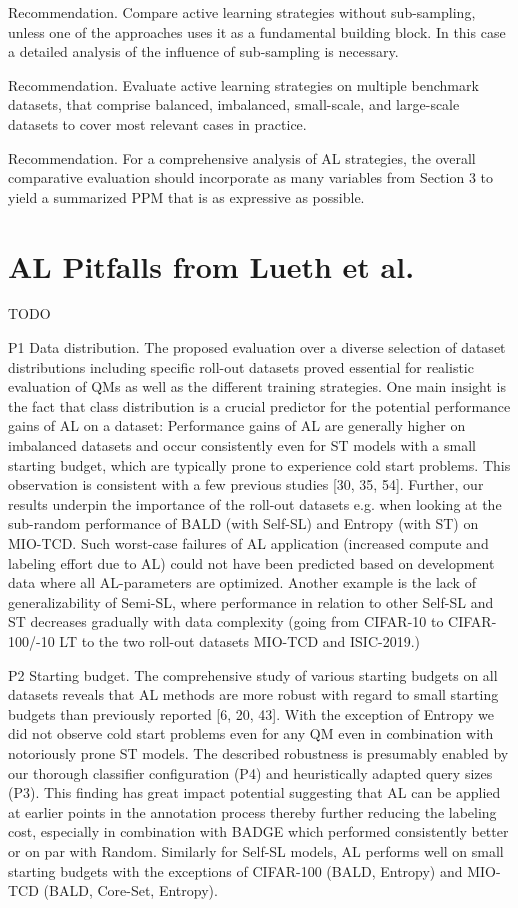 \documentclass[]{article}
\begin{document}
Recommendation. Compare active learning strategies
without sub-sampling, unless one of the approaches uses
it as a fundamental building block. In this case a detailed
analysis of the influence of sub-sampling is necessary.

Recommendation. Evaluate active learning strategies
on multiple benchmark datasets, that comprise balanced,
imbalanced, small-scale, and large-scale datasets to cover
most relevant cases in practice.

Recommendation. For a comprehensive analysis of
AL strategies, the overall comparative evaluation should
incorporate as many variables from Section 3 to yield a
summarized PPM that is as expressive as possible.


\section{AL Pitfalls from Lueth et al.}\label{app:pitfalls}
TODO

P1 Data distribution. The proposed evaluation over a diverse selection of dataset distributions
including specific roll-out datasets proved essential for realistic evaluation of QMs as well as the
different training strategies. One main insight is the fact that class distribution is a crucial predictor
for the potential performance gains of AL on a dataset: Performance gains of AL are generally higher
on imbalanced datasets and occur consistently even for ST models with a small starting budget,
which are typically prone to experience cold start problems. This observation is consistent with a few
previous studies [30, 35, 54]. Further, our results underpin the importance of the roll-out datasets e.g.
when looking at the sub-random performance of BALD (with Self-SL) and Entropy (with ST) on
MIO-TCD. Such worst-case failures of AL application (increased compute and labeling effort due to
AL) could not have been predicted based on development data where all AL-parameters are optimized.
Another example is the lack of generalizability of Semi-SL, where performance in relation to other
Self-SL and ST decreases gradually with data complexity (going from CIFAR-10 to CIFAR-100/-10
LT to the two roll-out datasets MIO-TCD and ISIC-2019.)

P2 Starting budget. The comprehensive study of various starting budgets on all datasets reveals
that AL methods are more robust with regard to small starting budgets than previously reported
[6, 20, 43]. With the exception of Entropy we did not observe cold start problems even for any QM
even in combination with notoriously prone ST models. The described robustness is presumably
enabled by our thorough classifier configuration (P4) and heuristically adapted query sizes (P3). This
finding has great impact potential suggesting that AL can be applied at earlier points in the annotation
process thereby further reducing the labeling cost, especially in combination with BADGE which
performed consistently better or on par with Random. Similarly for Self-SL models, AL performs
well on small starting budgets with the exceptions of CIFAR-100 (BALD, Entropy) and MIO-TCD
(BALD, Core-Set, Entropy).
\end{document}
